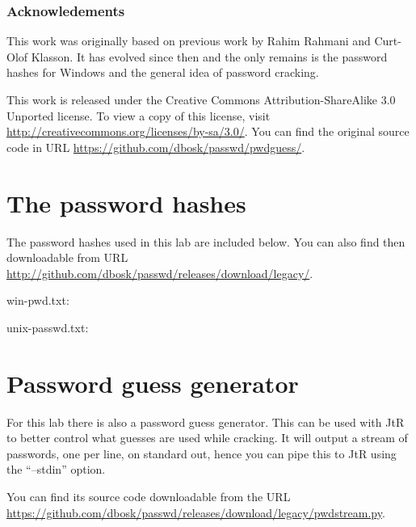 \subsubsection*{Acknowledements}

This work was originally based on previous work by Rahim Rahmani and Curt-Olof 
Klasson.
It has evolved since then and the only remains is the password hashes for 
Windows and the general idea of password cracking.

This work is released under the Creative Commons Attribution-ShareAlike 3.0 
Unported license.
To view a copy of this license, visit 
\url{http://creativecommons.org/licenses/by-sa/3.0/}.
You can find the original source code in URL 
\url{https://github.com/dbosk/passwd/pwdguess/}.


\appendix
\section{The password hashes}
\label{sec:hashes}
The password hashes used in this lab are included below.
You can also find then downloadable from URL
\url{http://github.com/dbosk/passwd/releases/download/legacy/}.

win-pwd.txt:


unix-passwd.txt:



\section{Password guess generator}
\label{sec:pwdstream}
For this lab there is also a password guess generator.
This can be used with \ac{JtR} to better control what guesses are used while 
cracking.
It will output a stream of passwords, one per line, on standard out, hence you 
can pipe this to \ac{JtR} using the \enquote{--stdin} option.

You can find its source code downloadable from the URL
\url{https://github.com/dbosk/passwd/releases/download/legacy/pwdstream.py}.

%


\printbibliography{}
